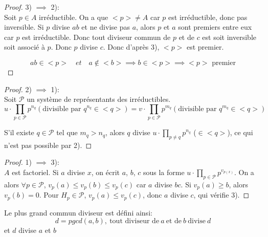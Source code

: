 \begin{proof}

	3) $\implies$ 2):\\
	Soit $p \in A$ irréductible. On a que $<p> \neq A$ car $p$ est irréductible, donc pas inversible.
	Si $p$ divise $ab$ et ne divise pas $a$, alors $p$ et $a$ sont premiers entre eux car $p$ est irréductible.
	Donc tout diviseur commun de $p$ et de $c$ est soit inversible soit associé à $p$. Donc $p$ divise $c$.
	Donc d'après 3), $<p>$ est premier.

	\[ ab \in <p>\quad  et \quad a \notin <b> \implies b \in <p> \implies <p> \text{ premier} \]

\end{proof}

\begin{proof}

	2) $\implies$ 1):\\
	Soit $\mathcal{P}$ un système de représentants des irréductibles.
	\begin{equation*}
		u \cdot \prod_{p \in \mathcal{P}} p^{n_q} (\text{divisible par } q^{n_q} \in <q> ) = v \cdot \prod_{p \in \mathcal{P}} p^{m_q} (\text{divisible par } q^{m_q} \in <q>)
	\end{equation*}
	\noindent

	S'il existe $q \in \mathcal{P}$ tel que $m_q > n_q$, alors $q$ divise $u \cdot \prod\limits_{p \ne q} p^{n_q}$ ($\in <q>$), ce qui n'est pas possible par 2).

\end{proof}

\begin{proof}

	1) $\implies$ 3):\\
	$A$ est factoriel. Si $a$  divise $x$, on écrit $a$, $b$, $c$ sous la forme $u \cdot \prod\limits_{p \in \mathcal{P}} p^{v_{p(x)}}$.
	On a alors $\forall p \in \mathcal{P}$, $v_p(a) \leqslant v_p(b) \leqslant v_p(c)$ car $a$ divise $bc$.
	Si $v_p(a) \geqslant b$, alors $v_p(b) = 0$.
	Pour $H_p \in \mathcal{P}$, $v_p(a) \leqslant v_p(c)$, donc $a$ divise $c$, qui vérifie 3).

\end{proof}


\begin{definition}[pgcd]
	Le plus grand commun diviseur est défini ainsi:
	$$d = pgcd (a,b),\  \text{tout diviseur de} \ a  \ \text{et de} \ b \ \text{divise} \ d$$
	et $d$ divise $a$ et $b$
\end{definition}

